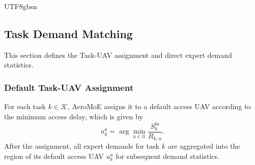 \documentclass[journal]{IEEEtran}
\begin{document}
\begin{CJK*}{UTF8}{gbsn}
\subsection{Task Demand Matching}\label{sec:demand_modeling}
This section defines the Task-UAV assignment and direct expert demand statistics.
\subsubsection{Default Task-UAV Assignment}
For each task \(k \in \mathcal{K}\), AeroMoE assigns it to a default access UAV according to the minimum access delay, which is given by
\begin{equation}
u_k^a = \arg\min_{u \in \mathcal{U}} \frac{S_k^{\mathrm{in}}}{R_{k,u}}.
\label{eq:default_access}
\end{equation}
After the assignment, all expert demands for task \(k\) are aggregated into the region of its default access UAV \(u_k^a\) for subsequent demand statistics.


\end{CJK*}
\end{document}
